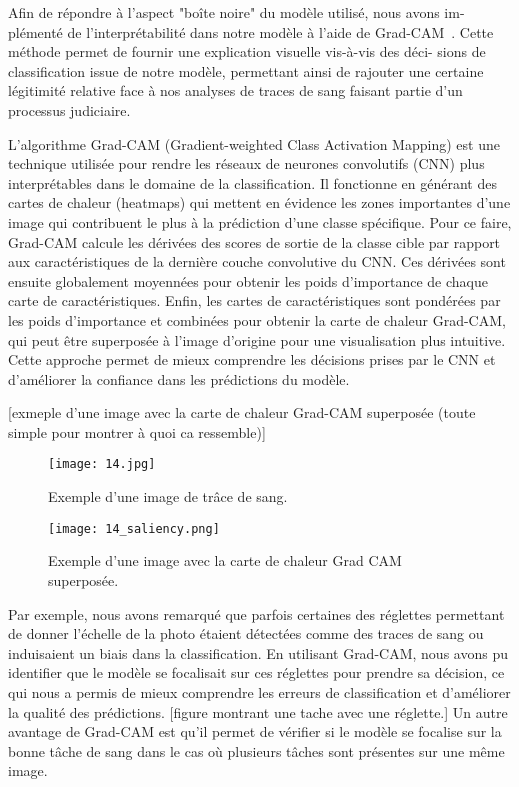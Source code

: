 \documentclass[a4paper]{article}
\begin{document}
Afin de répondre à l'aspect "boîte noire" du modèle utilisé, nous avons im-
plémenté de l'interprétabilité dans notre modèle à l'aide de Grad-CAM~\cite{GRADCAM}.
Cette méthode permet de fournir une explication visuelle vis-à-vis des déci-
sions de classification issue de notre modèle, permettant ainsi de rajouter une
certaine légitimité relative face à nos analyses de traces de sang faisant partie
d'un processus judiciaire. 

L'algorithme Grad-CAM (Gradient-weighted Class Activation Mapping) est une technique utilisée pour rendre les réseaux de neurones convolutifs (CNN) plus interprétables dans le domaine de la classification.
Il fonctionne en générant des cartes de chaleur (heatmaps) qui mettent en évidence les zones importantes d'une image qui contribuent le plus à la prédiction d'une classe spécifique.
Pour ce faire, Grad-CAM calcule les dérivées des scores de sortie de la classe cible par rapport aux caractéristiques de la dernière couche convolutive du CNN.
Ces dérivées sont ensuite globalement moyennées pour obtenir les poids d'importance de chaque carte de caractéristiques.
Enfin, les cartes de caractéristiques sont pondérées par les poids d'importance et combinées pour obtenir la carte de chaleur Grad-CAM, qui peut être superposée à l'image d'origine pour une visualisation plus intuitive.
Cette approche permet de mieux comprendre les décisions prises par le CNN et d'améliorer la confiance dans les prédictions du modèle.

[exmeple d'une image avec la carte de chaleur Grad-CAM superposée (toute simple pour montrer à quoi ca ressemble)]

\begin{figure}
    \centering
    \begin{minipage}{0.45\textwidth}
        \centering
        \texttt{[image: 14.jpg]}
        \caption{Exemple d'une image de trâce de sang.}
        \label{fig:grad_cam_example1}
    \end{minipage}\hfill
    \begin{minipage}{0.45\textwidth}
        \centering
        \texttt{[image: 14\_saliency.png]}
        \caption{Exemple d'une image avec la carte de chaleur Grad CAM superposée.}
        \label{fig:grad_cam_example2}
    \end{minipage}
\end{figure}

Par exemple, nous avons remarqué que parfois certaines des réglettes permettant de donner l'échelle de la photo étaient détectées comme des traces de sang ou induisaient un biais dans la classification.
En utilisant Grad-CAM, nous avons pu identifier que le modèle se focalisait sur ces réglettes pour prendre sa décision, ce qui nous a permis de mieux comprendre
les erreurs de classification et d'améliorer la qualité des prédictions.
[figure montrant une tache avec une réglette.]
Un autre avantage de Grad-CAM est qu'il permet de vérifier si le modèle se focalise sur la bonne tâche de sang
dans le cas où plusieurs tâches sont présentes sur une même image.
\end{document}
